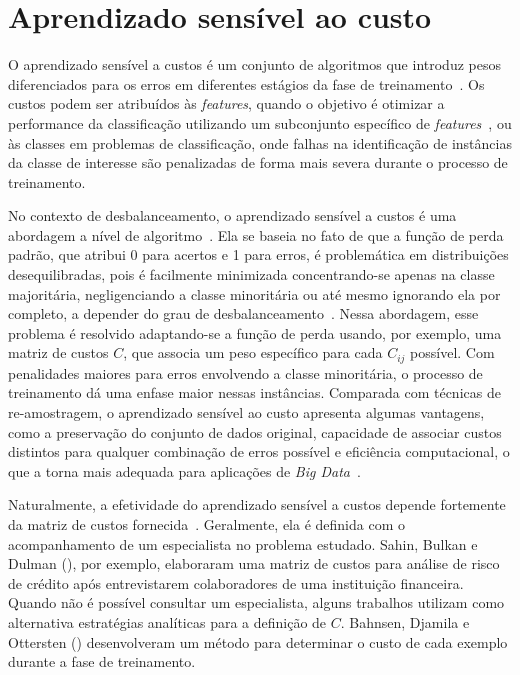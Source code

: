 \section{Aprendizado sensível ao custo}

O aprendizado sensível a custos é um conjunto de algoritmos que introduz pesos diferenciados para os erros em diferentes estágios da fase de treinamento~\cite{FernndezCs2018}. Os custos podem ser atribuídos às \textit{features}, quando o objetivo é otimizar a performance da classificação utilizando um subconjunto específico de \textit{features}~\cite{Zhou2016}, ou às classes em problemas de classificação, onde falhas na identificação de instâncias da classe de interesse são penalizadas de forma mais severa durante o processo de treinamento.

No contexto de desbalanceamento, o aprendizado sensível a custos é uma abordagem a nível de algoritmo~\cite{Krawczyk2016}. Ela se baseia no fato de que a função de perda padrão, que atribui 0 para acertos e 1 para erros, é problemática em distribuições desequilibradas, pois é facilmente minimizada concentrando-se apenas na classe majoritária, negligenciando a classe minoritária ou até mesmo ignorando ela por completo, a depender do grau de desbalanceamento~\cite{Landgrebe2004}. Nessa abordagem, esse problema é resolvido adaptando-se a função de perda usando, por exemplo, uma matriz de custos \(C\), que associa um peso específico para cada \(C_{ij}\) possível. Com penalidades maiores para erros envolvendo a classe minoritária, o processo de treinamento dá uma enfase maior nessas instâncias. Comparada com técnicas de re-amostragem, o aprendizado sensível ao custo apresenta algumas vantagens, como a preservação do conjunto de dados original, capacidade de associar custos distintos para qualquer combinação de erros possível e eficiência computacional, o que a torna mais adequada para aplicações de \textit{Big Data}~\cite{Haixiang2017}.

Naturalmente, a efetividade do aprendizado sensível a custos depende fortemente da matriz de custos fornecida~\cite{FernndezCs2018}. Geralmente, ela é definida com o acompanhamento de um especialista no problema estudado. Sahin, Bulkan e Dulman (\citeyear{Sahin2013}), por exemplo, elaboraram uma matriz de custos para análise de risco de crédito após entrevistarem colaboradores de uma instituição financeira. Quando não é possível consultar um especialista, alguns trabalhos utilizam como alternativa estratégias analíticas para a definição de \(C\). Bahnsen, Djamila e Ottersten (\citeyear{Bahnsen2015}) desenvolveram um método para determinar o custo de cada exemplo durante a fase de treinamento.

